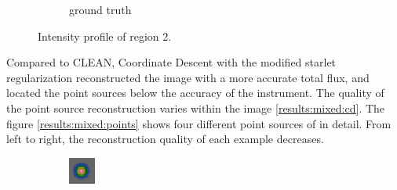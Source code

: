 \begin{figure}[h]
\begin{subfigure}[b]{0.6\linewidth}
		\caption{ground truth}
		\label{results:mixed:cut1:profile}
	\end{subfigure}
	\caption{Intensity profile of region 2.}
	\label{results:mixed:cut1:contour}
\end{figure}

Compared to CLEAN, Coordinate Descent with the modified starlet regularization reconstructed the image with a more accurate total flux, and located the point sources below the accuracy of the instrument. The quality of the point source reconstruction varies within the image \ref{results:mixed:cd}. The figure \ref{results:mixed:points} shows four different point sources of in detail. From left to right, the reconstruction quality of each example decreases.

\begin{figure}[h]
	\centering
	\begin{subfigure}[b]{0.2\linewidth}
		\includegraphics[width=\linewidth]{./chapters/20.results/mixed/problems/point1.png}
	\end{subfigure}
	\begin{subfigure}[b]{0.2\linewidth}

\end{subfigure}
\end{figure}
